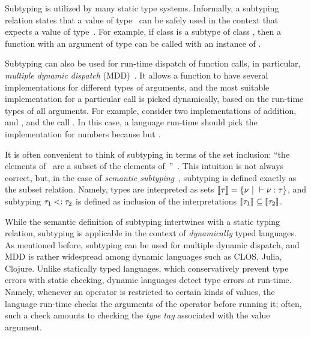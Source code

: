 Subtyping is utilized by many static type systems.
Informally, a subtyping relation  states that
a value of type~ can be safely used
in the context that expects a value of type~.
For example, if class  is a subtype of class ,
then a function with an argument of type 
can be called with an instance of . 

Subtyping can also be used for run-time dispatch of function calls, 
in particular, \emph{multiple dynamic dispatch} 
(MDD)~\cite{bib:Chambers:1992:Cecil,bib:Clifton:2000:MultiJava}.
It allows a function to have several implementations 
for different types of arguments,
and the most suitable implementation for a particular call 
is picked dynamically, based on the run-time types of all arguments.
For example, consider two implementations of addition,
 and ,
and the call .
In this case, a language run-time should pick 
the implementation for numbers 
because  but .

It is often convenient to think of subtyping 
in terms of the set inclusion: ``the elements of~ are a subset
of the elements of~''~\cite{bib:Pierce:2002:TAPL}.
This intuition is not always correct, but, in the case of
\emph{semantic subtyping}~\cite{bib:Hosoya:2003:XDuce,
  bib:Frisch:2008:sem-sub, bib:Ancona:2016:sem-sub-oo}, 
subtyping is defined exactly as the subset relation. %
Namely, types are interpreted as sets
$\llbracket \tau \rrbracket = \{\nu ~\vert~ \vdash \nu : \tau \}$, 
and subtyping $\tau_1 <: \tau_2$ is defined as inclusion 
of the interpretations
$\llbracket \tau_1 \rrbracket \subseteq \llbracket \tau_2 \rrbracket$.

While the semantic definition of subtyping intertwines with 
a static typing relation,
subtyping is applicable in the context of 
\emph{dynamically} typed languages.
As mentioned before, subtyping can be used for multiple dynamic dispatch,
and MDD is rather widespread among dynamic languages
such as CLOS, Julia, Clojure.
Unlike statically typed languages, 
which conservatively prevent type errors with static checking,
dynamic languages detect type errors at run-time.
Namely, whenever an operator is restricted to certain kinds of values,
the language run-time checks the arguments of the operator before running it;
often, such a check amounts to checking the \emph{type tag} associated 
with the value argument.

